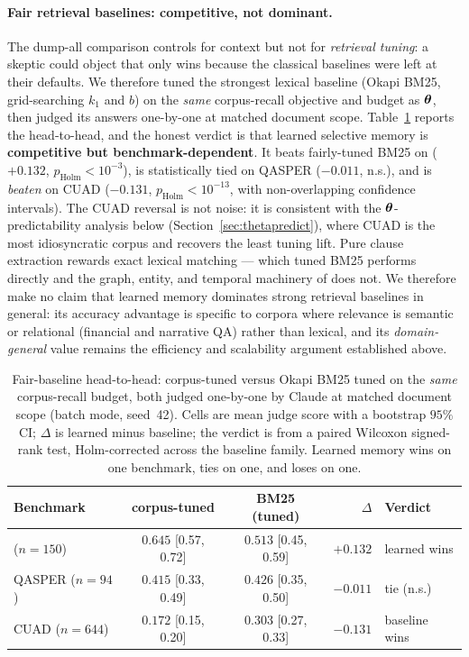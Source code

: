 \paragraph{Fair retrieval baselines: competitive, not dominant.} The dump-all
comparison controls for context but not for \emph{retrieval tuning}: a skeptic
could object that \Vt{} only wins because the classical baselines were left at
their defaults. We therefore tuned the strongest lexical baseline (Okapi BM25,
grid-searching $k_1$ and $b$) on the \emph{same} corpus-recall objective and
budget as $\boldsymbol{\theta}$, then judged its answers one-by-one at matched document
scope. Table~\ref{tab:fairbaseline} reports the head-to-head, and the honest
verdict is that learned selective memory is \textbf{competitive but
benchmark-dependent}. It beats fairly-tuned BM25 on \FB{}
($+0.132$, $p_{\mathrm{Holm}}{<}10^{-3}$), is statistically tied on QASPER
($-0.011$, n.s.), and is \emph{beaten} on CUAD ($-0.131$,
$p_{\mathrm{Holm}}{<}10^{-13}$, with non-overlapping confidence intervals). The
CUAD reversal is not noise: it is consistent with the $\boldsymbol{\theta}$-predictability
analysis below (Section~\ref{sec:thetapredict}), where CUAD is the most
idiosyncratic corpus and recovers the least tuning lift. Pure clause extraction
rewards exact lexical matching --- which tuned BM25 performs directly and the
graph, entity, and temporal machinery of \Vt{} does not. We therefore make no
claim that learned memory dominates strong retrieval baselines in general: its
accuracy advantage is specific to corpora where relevance is semantic or
relational (financial and narrative QA) rather than lexical, and its
\emph{domain-general} value remains the efficiency and scalability argument
established above.

\begin{table}[t]
  \centering
  \caption{Fair-baseline head-to-head: corpus-tuned \Vt{} versus Okapi BM25 tuned
  on the \emph{same} corpus-recall budget, both judged one-by-one by Claude at
  matched document scope (batch mode, seed~42). Cells are mean judge score with a
  bootstrap $95\%$ CI; $\Delta$ is learned minus baseline; the verdict is from a
  paired Wilcoxon signed-rank test, Holm-corrected across the baseline family.
  Learned memory wins on one benchmark, ties on one, and loses on one.}
  \label{tab:fairbaseline}
  \footnotesize
  \begin{tabular}{lccrl}
    \toprule
    Benchmark & \Vt{} corpus-tuned & BM25 (tuned) & $\Delta$ & Verdict \\
    \midrule
    \FB{} ($n{=}150$) & $\mathbf{0.645}$ {\scriptsize[0.57, 0.72]} & $0.513$ {\scriptsize[0.45, 0.59]} & $+0.132$ & learned wins \\
    QASPER ($n{=}94$) & $0.415$ {\scriptsize[0.33, 0.49]} & $0.426$ {\scriptsize[0.35, 0.50]} & $-0.011$ & tie (n.s.) \\
    CUAD ($n{=}644$) & $0.172$ {\scriptsize[0.15, 0.20]} & $\mathbf{0.303}$ {\scriptsize[0.27, 0.33]} & $-0.131$ & baseline wins \\
    \bottomrule
  \end{tabular}
\end{table}

